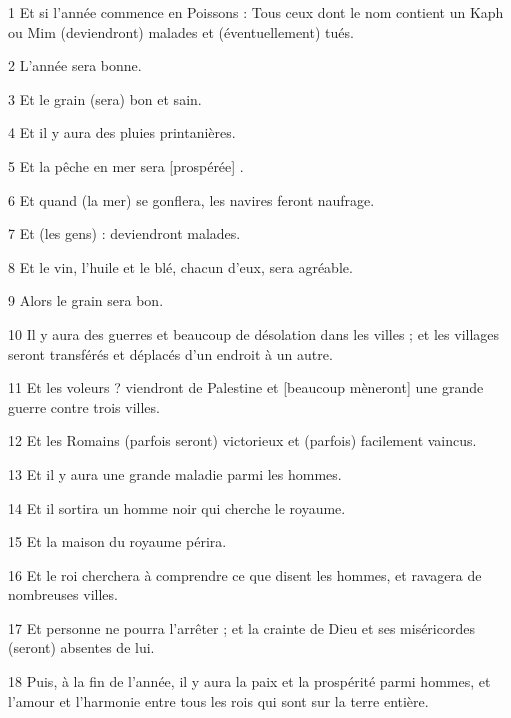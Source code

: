 \par 1 Et si l'année commence en Poissons : Tous ceux dont le nom contient un Kaph ou Mim (deviendront) malades et (éventuellement) tués.

\par 2 L'année sera bonne.

\par 3 Et le grain (sera) bon et sain.

\par 4 Et il y aura des pluies printanières.

\par 5 Et la pêche en mer sera [prospérée] .

\par 6 Et quand (la mer) se gonflera, les navires feront naufrage.

\par 7 Et (les gens) : deviendront malades.

\par 8 Et le vin, l'huile et le blé, chacun d'eux, sera agréable.

\par 9 Alors le grain sera bon.

\par 10 Il y aura des guerres et beaucoup de désolation dans les villes ; et les villages seront transférés et déplacés d'un endroit à un autre.

\par 11 Et les voleurs ? viendront de Palestine et [beaucoup mèneront] une grande guerre contre trois villes.

\par 12 Et les Romains (parfois seront) victorieux et (parfois) facilement vaincus.

\par 13 Et il y aura une grande maladie parmi les hommes.

\par 14 Et il sortira un homme noir qui cherche le royaume.

\par 15 Et la maison du royaume périra.

\par 16 Et le roi cherchera à comprendre ce que disent les hommes, et ravagera de nombreuses villes.

\par 17 Et personne ne pourra l'arrêter ; et la crainte de Dieu et ses miséricordes (seront) absentes de lui.

\par 18 Puis, à la fin de l'année, il y aura la paix et la prospérité parmi hommes, et l'amour et l'harmonie entre tous les rois qui sont sur la terre entière.

